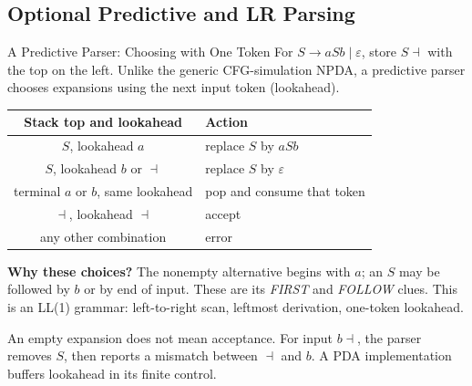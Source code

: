 \documentclass[10pt]{beamer}
\begin{document}
\subsection{Optional Predictive and LR Parsing}

\begin{frame}{A Predictive Parser: Choosing with One Token}
  \small
  For $S\to aSb\mid\varepsilon$, store $S\dashv$ with the top on the left.
  Unlike the generic CFG-simulation NPDA, a predictive parser chooses
  expansions using the next input token (lookahead).
  \begin{center}
  \begin{tabular}{cl}
    \toprule
    Stack top and lookahead & Action \\
    \midrule
    $S$, lookahead $a$ & replace $S$ by $aSb$ \\
    $S$, lookahead $b$ or $\dashv$ & replace $S$ by $\varepsilon$ \\
    terminal $a$ or $b$, same lookahead & pop and consume that token \\
    $\dashv$, lookahead $\dashv$ & accept \\
    any other combination & error \\
    \bottomrule
  \end{tabular}
  \end{center}
  \pause
  \textbf{Why these choices?} The nonempty alternative begins with $a$;
  an $S$ may be followed by $b$ or by end of input. These are its
  \emph{FIRST} and \emph{FOLLOW} clues. This is an LL(1) grammar:
  left-to-right scan, leftmost derivation, one-token lookahead.
  \pause
  \par\smallskip
  An empty expansion does not mean acceptance. For input $b\dashv$, the
  parser removes $S$, then reports a mismatch between $\dashv$ and $b$.
  A PDA implementation buffers lookahead in its finite control.
\end{frame}
\end{document}
